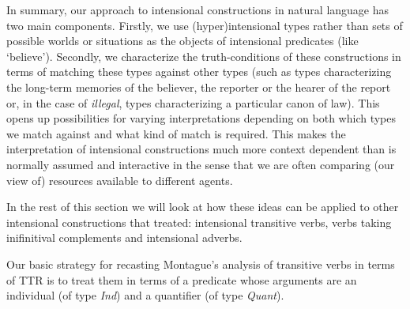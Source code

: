 
In summary, our approach to intensional constructions in natural
language has two main components.  Firstly, we use (hyper)intensional
types rather than sets of possible worlds or situations as the objects
of intensional predicates (like `believe').  Secondly, we characterize
the truth-conditions of these constructions in terms of matching these
types against other types (such as types characterizing the long-term
memories of the believer, the reporter or the hearer of the report or,
in the case of \textit{illegal}, types characterizing a particular
canon of law).  This opens up possibilities for varying
interpretations depending on both which types we match against and
what kind of match is required.  This makes the interpretation of
intensional constructions much more context dependent than is normally
assumed and interactive in the sense that we are often comparing (our
view of) resources available to different agents.

In the rest of this section we will look at how these ideas can be
applied to other intensional constructions that \cite{Montague1973}
treated:  intensional
transitive verbs, verbs taking inifinitival complements and
intensional adverbs.

Our basic strategy for recasting Montague's analysis of transitive
verbs in terms of TTR is to treat them in terms of a predicate whose
arguments are an individual (of type \textit{Ind}) and a quantifier
(of type \textit{Quant}).  %

